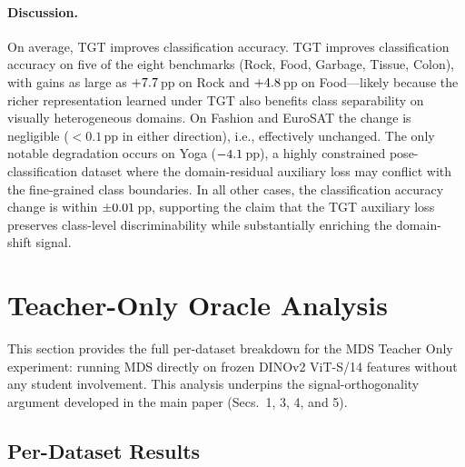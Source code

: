 \documentclass[runningheads]{llncs}
\begin{document}
\begin{table}[h]
  \centering
  \caption{Classification accuracy (\%) for CE-trained and TGT-trained ResNet-50 on each
  benchmark.
  $\Delta$ (pp) is the change from CE to TGT: positive values indicate TGT
  \emph{improves} classification accuracy.
  All values are the best accuracy over 3 seeds.}
  \label{tab:supp:accuracy}
  \resizebox{\linewidth}{!}{}
\end{table}

\paragraph{Discussion.}
On average, TGT improves classification accuracy.
TGT improves classification accuracy on five of the eight benchmarks (Rock, Food,
Garbage, Tissue, Colon), with gains as large as $+7.7$\,pp on Rock and $+4.8$\,pp on
Food---likely because the richer representation learned under TGT also benefits class
separability on visually heterogeneous domains.
On Fashion and EuroSAT the change is negligible ($<0.1$\,pp in either direction), i.e., effectively unchanged.
The only notable degradation occurs on Yoga ($-4.1$\,pp), a highly constrained
pose-classification dataset where the domain-residual auxiliary loss may conflict with
the fine-grained class boundaries.
In all other cases, the classification accuracy change is within $\pm0.01$\,pp, supporting
the claim that the TGT auxiliary loss preserves class-level discriminability while
substantially enriching the domain-shift signal.

\section{Teacher-Only Oracle Analysis}
\label{sec:supp:teacher-oracle}

This section provides the full per-dataset breakdown for the MDS Teacher Only experiment:
running MDS directly on frozen DINOv2 ViT-S/14 features without any student involvement.
This analysis underpins the signal-orthogonality argument developed in the main paper
(Secs.~1, 3, 4, and 5).

\subsection{Per-Dataset Results}
\end{document}
